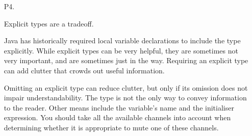 \documentclass[11pt,a4paper, titlepage, parskip=half, headsepline, footsepline, cleardoublepage=current, headheight=1cm]{scrbook}
\begin{document}
\begin{enumerate}
{Code should be self-revealing. It should be understandable on its face, without the need for assistance from tools.}

\item[P4.]{Explicit types are a tradeoff.

Java has historically required local variable declarations to include the type explicitly. While explicit types can be very helpful, they are sometimes not very important, and are sometimes just in the way. Requiring an explicit type can add clutter that crowds out useful information.

Omitting an explicit type can reduce clutter, but only if its omission does not impair understandability. The type is not the only way to convey information to the reader. Other means include the variable's name and the initialiser expression. You should take all the available channels into account when determining whether it is appropriate to mute one of these channels.}
\end{enumerate}
\end{document}
